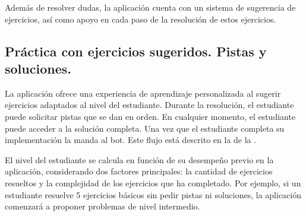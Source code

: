 Además de resolver dudas, la aplicación cuenta con un sistema de sugerencia de ejercicios, así como apoyo en cada paso de la resolución de estos ejercicios.

\subsection{Práctica con ejercicios sugeridos. Pistas y soluciones.}

La aplicación ofrece una experiencia de aprendizaje personalizada al sugerir ejercicios adaptados al nivel del estudiante. Durante la resolución, el estudiante puede solicitar pistas que se dan en orden. En cualquier momento, el estudiante puede acceder a la solución completa. Una vez que el estudiante completa su implementación la manda al bot. Este flujo está descrito en la  de la .

El nivel del estudiante se calcula en función de su desempeño previo en la aplicación, considerando dos factores principales: la cantidad de ejercicios resueltos y la complejidad de los ejercicios que ha completado. Por ejemplo, si un estudiante resuelve 5 ejercicios básicos sin pedir pistas ni soluciones, la aplicación comenzará a proponer problemas de nivel intermedio.

